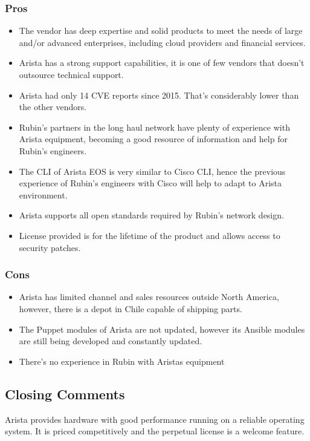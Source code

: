 \subsubsection{Pros}
\begin{itemize}
  \item The vendor has deep expertise and solid products to meet the needs of large and/or advanced enterprises, including cloud providers and financial services.
  \item Arista has a strong support capabilities, it is one of few vendors that doesn't outsource technical support.
  \item Arista had only 14 CVE reports since 2015. That's considerably lower than the other vendors. 
  \item Rubin's partners in the long haul network have plenty of experience with Arista equipment, becoming a good resource of information and help for Rubin's engineers. 
  \item The CLI of Arista EOS is very similar to Cisco CLI, hence the previous experience of Rubin's engineers with Cisco will help to adapt to Arista environment.
  \item Arista supports all open standards required by Rubin's network design.
  \item License provided is for the lifetime of the product and allows access to security patches.
\end{itemize}

\subsubsection{Cons}
\begin{itemize}
  \item Arista has limited channel and sales resources outside North America, however, there is a depot in Chile capable of shipping parts. 
  \item The Puppet modules of Arista are not updated, however its Ansible modules are still being developed and constantly updated. 
  \item There's no experience in Rubin with Aristas equipment
\end{itemize}

\subsection{Closing Comments}

Arista provides hardware with good performance running on a reliable operating system. It is priced competitively and the perpetual license is a welcome feature. 

